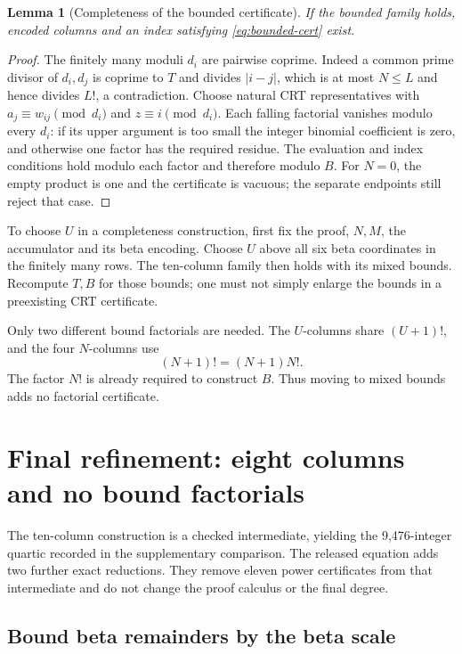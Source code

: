 \documentclass[11pt,a4paper]{article}
\newtheorem{lemma}[theorem]{Lemma}
\theoremstyle{definition}\newtheorem{definition}[theorem]{Definition}
\theoremstyle{remark}\newtheorem{remark}[theorem]{Remark}
\numberwithin{equation}{section}
\begin{document}
\begin{lemma}[Completeness of the bounded certificate]
If the bounded family holds, encoded columns and an index satisfying
\eqref{eq:bounded-cert} exist.
\end{lemma}
\begin{proof}
The finitely many moduli \(d_i\) are pairwise coprime. Indeed a common
prime divisor of \(d_i,d_j\) is coprime to \(T\) and divides
\(|i-j|\), which is at most \(N\le L\) and hence divides \(L!\),
a contradiction. Choose natural CRT representatives with
\(a_j\equiv w_{ij}\pmod{d_i}\) and \(z\equiv i\pmod{d_i}\).
Each falling factorial vanishes modulo every \(d_i\): if its upper
argument is too small the integer binomial coefficient is zero, and
otherwise one factor has the required residue. The evaluation and index
conditions hold modulo each factor and therefore modulo \(B\).
For \(N=0\), the empty product is one and the certificate is vacuous;
the separate endpoints still reject that case.
\end{proof}

To choose \(U\) in a completeness construction, first fix the proof,
\(N,M\), the accumulator and its beta encoding. Choose \(U\) above all
six beta coordinates in the finitely many rows. The ten-column family
then holds with its mixed bounds. Recompute \(T,B\) for those bounds;
one must not simply enlarge the bounds in a preexisting CRT certificate.

Only two different bound factorials are needed. The \(U\)-columns share
\((U+1)!\), and the four \(N\)-columns use
\begin{equation}
 (N+1)!=(N+1)N!.
\label{eq:sharedfact}
\end{equation}
The factor \(N!\) is already required to construct \(B\). Thus moving
to mixed bounds adds no factorial certificate.

\section{Final refinement: eight columns and no bound factorials}
\label{sec:eight}

The ten-column construction is a checked intermediate, yielding the
9,476-integer quartic recorded in the supplementary comparison. The
released equation adds two further exact reductions. They remove eleven
power certificates from that intermediate and do not change the proof
calculus or the final degree.

\subsection{Bound beta remainders by the beta scale}
\end{document}
